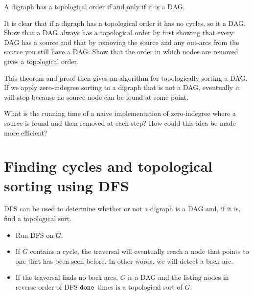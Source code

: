 \begin{Theorem} \label{thm:topDAG}
A digraph has a topological order if and only if it is a DAG.
\end{Theorem}

\begin{Boxample}[7]
It is clear that if a digraph has a topological order it has no cycles, so it a DAG. 
Show that a DAG always has a topological order by first showing that every DAG has a source
and that by removing the source and any out-arcs from the source you still have a DAG. 
Show that the order in which nodes are removed gives a topological order.
\end{Boxample}

This theorem and proof then gives an algorithm 
for topologically sorting a DAG. 
If we apply zero-indegree sorting to a digraph that is not a DAG, 
eventually it will stop because no source node can be found at some point.

\begin{Boxample}[2.5]
What is the running time of a naive implementation of zero-indegree where a source is found and then removed at each step? How could this idea be made more efficient?
\end{Boxample}

\section{Finding cycles and topological sorting using DFS}
DFS can be used to determine whether or not a digraph is a DAG and, if it is, find a topological sort.
\begin{itemize}
  \item Run DFS on $G$.
  \item If $G$ contains a cycle, the traversal will eventually reach a node that points to one that has been seen before. 
  In other words, we will detect a back arc. 
  \item If the traversal finds no back arcs, $G$ is a DAG 
  and the listing nodes in reverse order of DFS $\operatorname{\text{\texttt{done}}}$ times is a topological sort of $G$.
\end{itemize}

